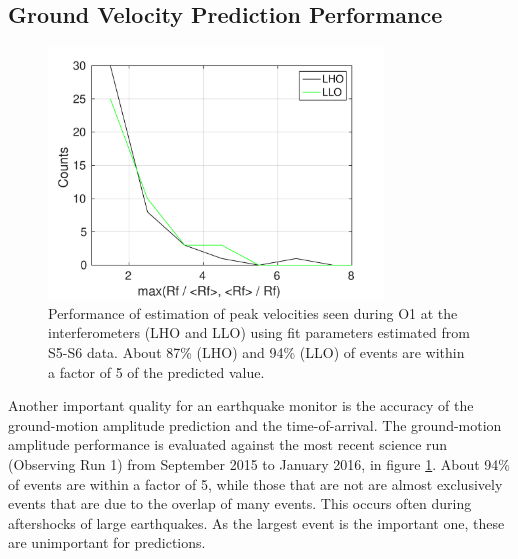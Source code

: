 \documentclass[reprint, prl, aps, showpacs]{revtex4-1}
\begin{document}
\subsection{Ground Velocity Prediction Performance}

\begin{figure}[t]
\hspace*{-0.5cm}
 \includegraphics[width=3.5in]{pred_diff.pdf}
 \caption{Performance of estimation of peak velocities seen during O1 at the interferometers (LHO and LLO) using fit parameters estimated from S5-S6 data. About 87\% (LHO) and 94\% (LLO) of events are within a factor of 5 of the predicted value.}
 \label{fig:regressionperf}
\end{figure}

Another important quality for an earthquake monitor is the accuracy of the ground-motion amplitude prediction and the time-of-arrival.
The ground-motion amplitude performance is evaluated against the most recent science run (Observing Run 1) from September 2015 to January 2016, in figure \ref{fig:regressionperf}. About 94\% of events are within a factor of 5, while those that are not are almost exclusively events that are due to the overlap of many events. This occurs often during aftershocks of large earthquakes. As the largest event is the important one, these are unimportant for predictions. 
\end{document}
